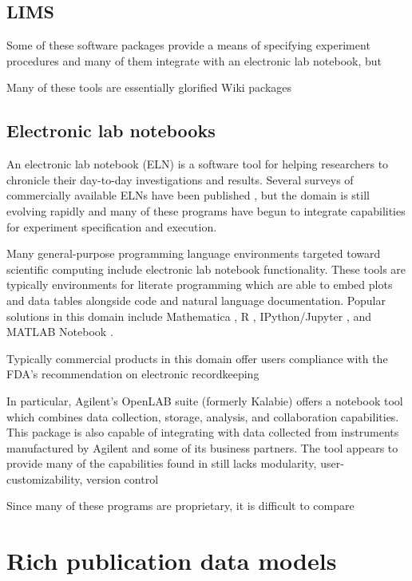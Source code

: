 \subsection{LIMS}
Some of these software packages provide a means of specifying
experiment procedures and many of them integrate with an electronic
lab notebook, but

Many of these tools are essentially glorified Wiki packages

\subsection{Electronic lab notebooks}

An electronic lab notebook (ELN) is a software tool for helping
researchers to chronicle their day-to-day investigations and
results. Several surveys of commercially available ELNs have been
published \cite{Rubacha2011, }, but the domain is still evolving
rapidly and many of these programs have begun to integrate
capabilities for experiment specification and execution.

Many general-purpose programming language environments targeted toward
scientific computing include electronic lab notebook functionality.
These tools are typically environments for literate programming
\cite{Knuth:1984:LP:473.479} which are able to embed plots and data
tables alongside code and natural language documentation. Popular
solutions in this domain include Mathematica \cite{mathematica},
R \cite{Rlang}, IPython/Jupyter \cite{IPython}, and
MATLAB Notebook \cite{MATLAB}.

Typically commercial products in this domain offer users compliance
with the FDA's recommendation on electronic recordkeeping \cite{FDA}

In particular, Agilent's OpenLAB suite (formerly Kalabie) offers a
notebook tool which combines data collection, storage, analysis, and
collaboration capabilities. This package is also capable of
integrating with data collected from instruments manufactured by
Agilent and some of its business partners. The tool appears to provide
many of the capabilities found in
 still lacks modularity, user-customizability, version control

Since many of these programs are proprietary, it is difficult to
compare



\section{Rich publication data models}

